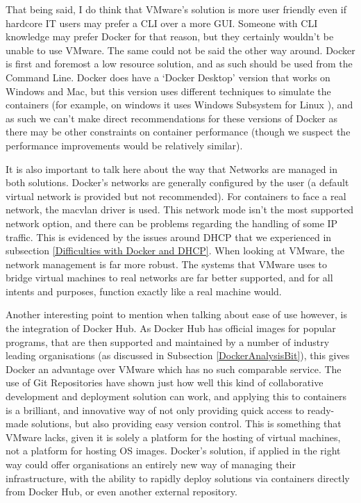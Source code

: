 That being said, I do think that VMware's solution is more user friendly even if hardcore IT users may prefer a CLI over a more GUI. Someone with CLI knowledge may prefer Docker for that reason, but they certainly wouldn't be unable to use VMware. The same could not be said the other way around. Docker is first and foremost a low resource solution, and as such should be used from the Command Line. Docker does have a `Docker Desktop' version that works on Windows and Mac, but this version uses different techniques to simulate the containers (for example, on windows it uses Windows Subsystem for Linux \citep{DockerWindows}), and as such we can't make direct recommendations for these versions of Docker as there may be other constraints on container performance (though we suspect the performance improvements would be relatively similar).

It is also important to talk here about the way that Networks are managed in both solutions. Docker's networks are generally configured by the user (a default virtual network is provided but not recommended). For containers to face a real network, the macvlan driver is used. This network mode isn't the most supported network option, and there can be problems regarding the handling of some IP traffic. This is evidenced by the issues around DHCP that we experienced in subsection \ref{Difficulties with Docker and DHCP}. When looking at VMware, the network management is far more robust. The systems that VMware uses to bridge virtual machines to real networks are far better supported, and for all intents and purposes, function exactly like a real machine would.

Another interesting point to mention when talking about ease of use however, is the integration of Docker Hub. As Docker Hub has official images for popular programs, that are then supported and maintained by a number of industry leading organisations (as discussed in Subsection \ref{DockerAnalysisBit}), this gives Docker an advantage over VMware which has no such comparable service. The use of Git Repositories have shown just how well this kind of collaborative development and deployment solution can work, and applying this to containers is a brilliant, and innovative way of not only providing quick access to ready-made solutions, but also providing easy version control. This is something that VMware lacks, given it is solely a platform for the hosting of virtual machines, not a platform for hosting OS images. Docker's solution, if applied in the right way could offer organisations an entirely new way of managing their infrastructure, with the ability to rapidly deploy solutions via containers directly from Docker Hub, or even another external repository.

